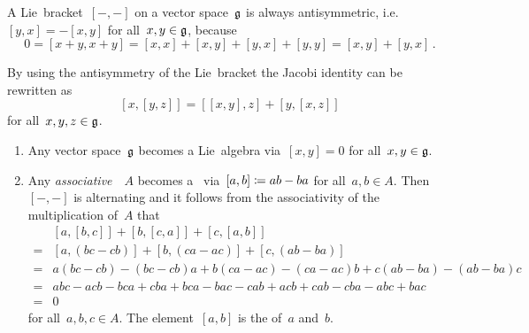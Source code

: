 \begin{remark}
  A Lie~bracket~$[-, -]$ on a vector space~$\mathfrak{g}$ is always antisymmetric, i.e.~$[y,x] = -[x,y]$ for all~$x,y \in \mathfrak{g}$, because
  \[
    0
    =
    [x+y, x+y]
    =
    [x,x] + [x,y] + [y,x] + [y,y]
    =
    [x,y] + [y,x] \,.
  \]
\end{remark}


\begin{remark}
  By using the antisymmetry of the Lie~bracket the Jacobi identity can be rewritten as
  \[
    [x,[y,z]]
    =
    [[x,y],z] + [y,[x,z]]
  \]
  for all~$x, y, z \in \mathfrak{g}$.
\end{remark}


\begin{examples}
  \label{examples for lie algebras}
  \leavevmode
  \begin{enumerate}
    \item
      Any vector space~$\mathfrak{g}$ becomes a Lie~algebra via~$[x,y] = 0$ for all~$x,y \in \mathfrak{g}$.
    \item
      Any \emph{associative}~{\algebra{$\kf$}}~$A$ becomes a~{\liealgebra{$\kf$}} via~$[a,b] \coloneqq ab - ba$ for all~$a, b \in A$.
      Then~$[-, -]$ is alternating and it follows from the associativity of the multiplication of~$A$ that
      \begin{align*}
         {}&  [a,[b,c]] + [b,[c,a]] + [c,[a,b]] \\
        ={}&  [a, (bc-cb)] + [b, (ca-ac)] + [c, (ab-ba)] \\
        ={}&  a(bc-cb)-(bc-cb)a + b(ca-ac) - (ca-ac)b + c(ab-ba) - (ab-ba)c \\
        ={}&  abc - acb - bca + cba + bca - bac - cab + acb + cab - cba - abc + bac \\
        ={}&  0
      \end{align*}
      for all~$a, b, c \in A$.
      The element~$[a,b]$ is the  of~$a$ and~$b$.
    

\end{enumerate}
\end{examples}
